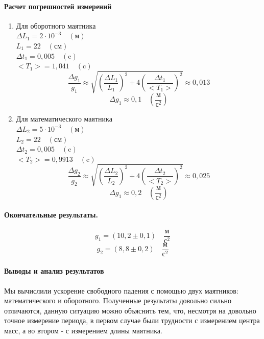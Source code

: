 \documentclass{article}
\begin{document}
\paragraph{Расчет погрешностей измерений }
\begin{enumerate}
	\item Для оборотного маятника\\
	$\Delta L_1 =2\cdot10^{-3} \quad(\mbox{м})$\\
	$L_1 = 22 \quad(\mbox{см})$\\
	$\Delta t_1 = 0,005 \quad(\mbox{c})$\\
	$ <T_1>= 1,041 \quad(\mbox{c})$
	$$\frac{\Delta g_1}{g_1}\approx\sqrt{\left(\frac{\Delta L_1}{L_1}\right)^2+4\left(\frac{\Delta t_1}{<T_1>}\right)^2}\approx0,013$$
	$$ \Delta g_1\approx0,1\quad\left(\frac{\mbox{м}}{\mbox{с}^2}\right)$$
		\item Для математического маятника\\
	$\Delta L_2 =5\cdot10^{-3} \quad(\mbox{м})$\\
	$L_2 = 22 \quad(\mbox{см})$\\
	$\Delta t_2 = 0,005 \quad(\mbox{c})$\\
	$ <T_2>= 0,9913 \quad(\mbox{c})$
	$$\frac{\Delta g_2}{g_2}\approx\sqrt{\left(\frac{\Delta L_2}{L_2}\right)^2+4\left(\frac{\Delta t_2}{<T_2>}\right)^2}\approx0,025$$
	$$ \Delta g_1\approx0,2 \quad\left(\frac{\mbox{м}}{\mbox{с}^2}\right)$$
\end{enumerate}

\paragraph{Окончательные результаты.}
$$ g_1=(10,2\pm0,1)\quad\frac{\mbox{м}}{\mbox{с}^2}$$
$$ g_2=(8,8\pm0,2)\quad\frac{\mbox{м}}{\mbox{с}^2}$$

\paragraph{Выводы и анализ результатов}
Мы вычислили ускорение свободного падения с помощью двух маятников: математического и оборотного. Полученные результаты довольно сильно отличаются, данную ситуацию можно объяснить тем, что, несмотря на довольно точное измерение периода, в первом случае были трудности с измерением центра масс, а во втором - с измерением длины маятника.
\end{document}
